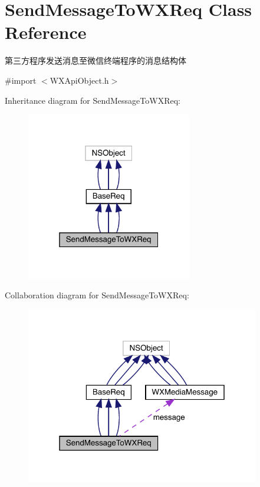 \hypertarget{interface_send_message_to_w_x_req}{}\section{Send\+Message\+To\+W\+X\+Req Class Reference}
\label{interface_send_message_to_w_x_req}


第三方程序发送消息至微信终端程序的消息结构体  




{\ttfamily \#import $<$W\+X\+Api\+Object.\+h$>$}



Inheritance diagram for Send\+Message\+To\+W\+X\+Req\+:\nopagebreak
\begin{figure}[H]
\begin{center}
\leavevmode
\includegraphics[width=205pt]{interface_send_message_to_w_x_req__inherit__graph}
\end{center}
\end{figure}


Collaboration diagram for Send\+Message\+To\+W\+X\+Req\+:\nopagebreak
\begin{figure}[H]
\begin{center}
\leavevmode
\includegraphics[width=289pt]{interface_send_message_to_w_x_req__coll__graph}
\end{center}
\end{figure}
